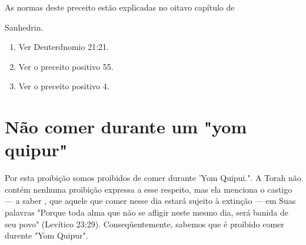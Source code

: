 \begin{itemize}
\begin{enumrate}
\begin{itemize}
\begin{itemize}
\begin{itemize}
As normas deste preceito estão explicadas no oitavo capítulo de


Sanhedrin.


\begin{enumerate}
\def\labelenumi{\arabic{enumi}.}
\setcounter{enumi}{365}
\item
 
 Ver Deuterdnomio 21:21.
 
\item
 
 Ver o preceito positivo 55.
 
\item
 
 Ver o preceito positivo 4.
 
\end{enumerate}



\section{Não comer durante um "yom quipur"}

Por esta proibição somos proibidos de comer durante 'Yom
Qui­pui.". A Torah não contém nenhuma proibição
expressa a esse respeito, mas ela menciona o castigo --- a saber , que
aquele que comer nesse dia estará sujei­to à extinção --- em Suas
palavras "Porque toda alma que não se afligir neste mesmo dia, será
banida de seu povo" (Levítico 23:29). Conseqüentemente, sa­bemos que é
proibido comer durente "Yom Quipur".



\end{itemize}
\end{itemize}
\end{itemize}
\end{enumrate}
\end{itemize}
